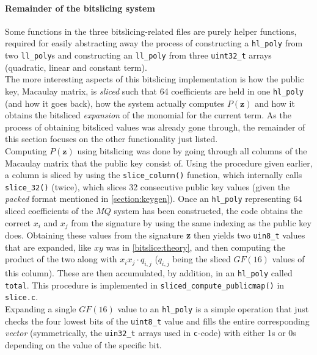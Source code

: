 \paragraph{Remainder of the bitslicing system}
Some functions in the three bitslicing-related files are purely helper functions, required for easily abstracting away the process of constructing a \texttt{hl\_poly} from two \texttt{ll\_poly}s and constructing an \texttt{ll\_poly} from three \texttt{uint32\_t} arrays (quadratic, linear and constant term).
\medskip\\
The more interesting aspects of this bitslicing implementation is how the public key, Macaulay matrix, is \emph{sliced} such that 64 coefficients are held in one \texttt{hl\_poly} (and how it goes back), how the system actually computes $P(\textbf{z})$ and how it obtains the bitsliced \emph{expansion} of the monomial for the current term. As the process of obtaining bitsliced values was already gone through, the remainder of this section focuses on the other functionality just listed.
\medskip\\
Computing $P(\textbf{z})$ using bitslicing was done by going through all columns of the Macaulay matrix that the public key consist of. Using the procedure given earlier, a column is sliced by using the \texttt{slice\_column()} function, which internally calls \texttt{slice\_32()} (twice), which slices 32 consecutive public key values (given the \emph{packed} format mentioned in \cref{section:keygen}). Once an \texttt{hl\_poly} representing 64 sliced coefficients of the $MQ$ system has been constructed, the code obtains the correct $x_i$ and $x_j$ from the signature by using the same indexing as the public key does. Obtaining these values from the signature \textbf{z} then yields two \texttt{uin8\_t} values that are expanded, like $xy$ was in \cref{bitslice:theory}, and then computing the product of the two along with $x_ix_j \cdot q_{i,j}$ ($q_{i,j}$ being the sliced $GF(16)$ values of this column). These are then accumulated, by addition, in an \texttt{hl\_poly} called \texttt{total}. This procedure is implemented in \texttt{sliced\_compute\_publicmap()} in \texttt{slice.c}.
\medskip\\
Expanding a single $GF(16)$ value to an \texttt{hl\_poly} is a simple operation that just checks the four lowest bits of the \texttt{uint8\_t} value and fills the entire corresponding \emph{vector} (symmetrically, the \texttt{uin32\_t} arrays used in \texttt{c}-code) with either 1s or 0s depending on the value of the specific bit.
\medskip\\

